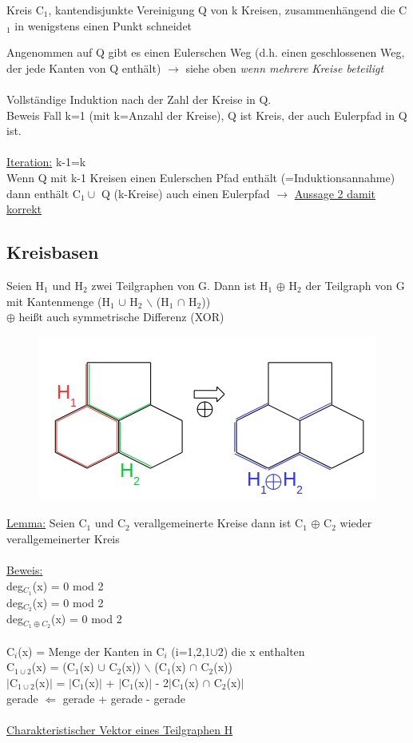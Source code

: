 Kreis C$_1$, kantendisjunkte Vereinigung Q von k Kreisen, zusammenhängend die C$_1$ in wenigstens einen Punkt schneidet

Angenommen auf Q gibt es einen Eulerschen Weg (d.h. einen geschlossenen Weg, der jede Kanten von Q enthält) $\rightarrow$ siehe oben \emph{wenn mehrere Kreise beteiligt}
\\\\
Vollständige Induktion nach der Zahl der Kreise in Q.\\
Beweis Fall k=1 (mit k=Anzahl der Kreise), Q ist Kreis, der auch Eulerpfad in Q ist.
\\\\
\underline{Iteration:} k-1=k\\
Wenn Q mit k-1 Kreisen einen Eulerschen Pfad enthält (=Induktionsannahme) dann enthält C$_1 \cup$ Q (k-Kreise) auch einen Eulerpfad $\rightarrow$ \underline{Aussage 2 damit korrekt}

\subsection{Kreisbasen}
Seien H$_1$ und H$_2$ zwei Teilgraphen von G. Dann ist H$_1$ $\oplus$ H$_2$ der Teilgraph von G mit Kantenmenge (H$_1$ $\cup$ H$_2$ $\backslash$ (H$_1$ $\cap$ H$_2$))\\
$\oplus$ heißt auch symmetrische Differenz (XOR)
\begin{figure}[htp]
\centering
\includegraphics[scale=1.00]{lectures/161104/pix/pic5.jpg}
\end{figure}

\underline{Lemma:} Seien C$_1$ und C$_2$ verallgemeinerte Kreise dann ist C$_1$ $\oplus$ C$_2$ wieder verallgemeinerter Kreis
\\\\
\underline{Beweis:}\\
deg$_{C_1}$(x) = 0 mod 2\\
deg$_{C_2}$(x) = 0 mod 2\\
deg$_{C_1 \oplus C_2}$(x) = 0 mod 2
\\\\
C$_i$(x) = Menge der Kanten in C$_i$ (i=1,2,1$\cup$2) die x enthalten\\
C$_{1 \cup 2}$(x) = (C$_1$(x) $\cup$ C$_2$(x)) $\backslash$ (C$_1$(x) $\cap$ C$_2$(x))\\
$|$C$_{1 \cup 2}$(x)$|$ = $|$C$_1$(x)$|$ + $|$C$_1$(x)$|$ - 2$|$C$_1$(x) $\cap$ C$_2$(x)$|$\\
gerade $\Leftarrow$ gerade + gerade - gerade
\\\\
\underline{Charakteristischer Vektor eines Teilgraphen H}\\

